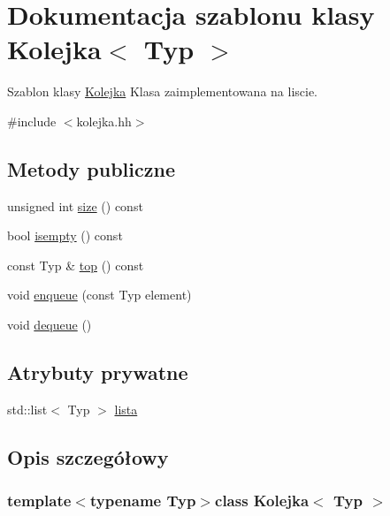 \hypertarget{class_kolejka}{\section{Dokumentacja szablonu klasy Kolejka$<$ Typ $>$}
\label{class_kolejka}
}


Szablon klasy \hyperlink{class_kolejka}{Kolejka} Klasa zaimplementowana na liscie.  




{\ttfamily \#include $<$kolejka.\-hh$>$}

\subsection*{Metody publiczne}
\begin{DoxyCompactItemize}
\item 
unsigned int \hyperlink{class_kolejka_a6fa67cc293681c3333e6d553cfe3ce84}{size} () const 
\item 
bool \hyperlink{class_kolejka_a6dca0c5c22b17197882b83a54b4649d4}{isempty} () const 
\item 
const Typ \& \hyperlink{class_kolejka_ab0222c8041187d540a4fe63ae15f0799}{top} () const 
\item 
void \hyperlink{class_kolejka_ac30514f0d3eb95411b472baebe859f2e}{enqueue} (const Typ element)
\item 
void \hyperlink{class_kolejka_a73e7c4df8f400108a4c48132c2476d5a}{dequeue} ()
\end{DoxyCompactItemize}
\subsection*{Atrybuty prywatne}
\begin{DoxyCompactItemize}
\item 
std\-::list$<$ Typ $>$ \hyperlink{class_kolejka_ac357392f2e883da4f59981f95ed69ec2}{lista}
\end{DoxyCompactItemize}


\subsection{Opis szczegółowy}
\subsubsection*{template$<$typename Typ$>$class Kolejka$<$ Typ $>$}



